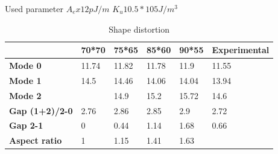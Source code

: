 Used parameter $ A_ex  12 pJ/m $
$ K_u 10.5*105 J/m^3$


\begin{figure}[!ht]
\centering
{}
\caption{}
\end{figure}



\begin{table}[ht!]
\centering
\begin{tabular}{|l|l|l|l|l|l|}
\hline
\textbf{} & \textbf{70*70} & \textbf{75*65} & \textbf{85*60} & \textbf{90*55} & \textbf{Experimental} \\ \hline
\textbf{Mode 0} & 11.74 & 11.82 & 11.78 & 11.9 & 11.55 \\ \hline
\textbf{Mode 1} & 14.5 & 14.46 & 14.06 & 14.04 & 13.94 \\ \hline
\textbf{Mode 2} &  & 14.9 & 15.2 & 15.72 & 14.6 \\ \hline
\textbf{Gap (1+2)/2-0} & 2.76 & 2.86 & 2.85 & 2.9 & 2.72 \\ \hline
\textbf{Gap 2-1} & 0 & 0.44 & 1.14 & 1.68 & 0.66 \\ \hline
\textbf{Aspect ratio} & 1 & 1.15 & 1.41 & 1.63 &  \\ \hline
\end{tabular}
\caption{Shape distortion}
\label{shapedist}
\end{table}


